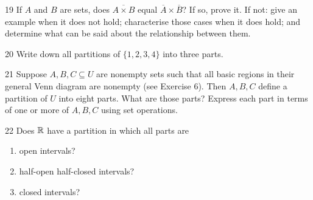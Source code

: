 \begin{exercise}{19}
    If $A$ and $B$ are sets, does $\overline{A\times B}$ equal
    $\overline A\times\overline B$? If so, prove it. If not: give an example when
    it does not hold; characterise those cases when it does hold; and determine
    what can be said about the relationship between them.
\end{exercise}

\begin{exercise}{20}
    Write down all partitions of $\{1,2,3,4\}$ into three parts.
\end{exercise}

\begin{exercise}{21}
    Suppose $A,B,C\subseteq U$ are nonempty sets such that all basic regions in
    their general Venn diagram are nonempty (see Exercise 6). Then $A,B,C$ define
    a partition of $U$ into eight parts. What are those parts? Express each part
    in terms of one or more of $A,B,C$ using set operations.
\end{exercise}

\begin{exercise}{22}
    Does $\mathbb{R}$ have a partition in which all parts are
    \begin{enumerate}[label=(\alph*)]
        \item open intervals?
        \item half-open half-closed intervals?
        \item closed intervals?
    \end{enumerate}
\end{exercise}
